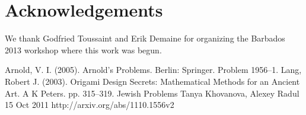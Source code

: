 \documentclass[11pt]{article}
\begin{document}
\section*{Acknowledgements}
We thank Godfried Toussaint and Erik Demaine for organizing the
Barbados 2013 workshop where this work was begun. 

%
%
\begin{thebibliography}{1}
Arnold, V. I. (2005). 
Arnold's Problems. Berlin: Springer.
Problem 1956--1.
Lang, Robert J. (2003). Origami Design Secrets: Mathematical Methods
for an Ancient Art. A K Peters. pp. 315--319.
Jewish Problems
Tanya Khovanova, Alexey Radul
 15 Oct 2011
http://arxiv.org/abs/1110.1556v2
\end{thebibliography}
\end{document}
